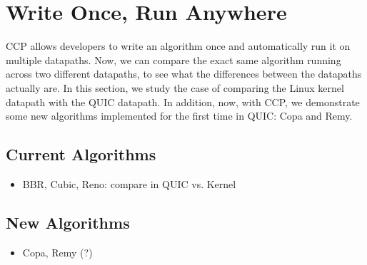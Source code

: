 \chapter{Write Once, Run Anywhere}
CCP allows developers to write an algorithm once and automatically run it on multiple datapaths.
Now, we can compare the exact same algorithm running across two different datapaths, to see what the differences between the datapaths actually are. In this section, we study the case of comparing the Linux kernel datapath with the QUIC datapath.
In addition, now, with CCP, we demonstrate some new algorithms implemented for the first time in QUIC: Copa and Remy.
\section{Current Algorithms}
\begin{itemize}
    \item BBR, Cubic, Reno: compare in QUIC vs. Kernel
\end{itemize}
\section{New Algorithms}
\begin{itemize}
    \item Copa, Remy (?)
\end{itemize}

